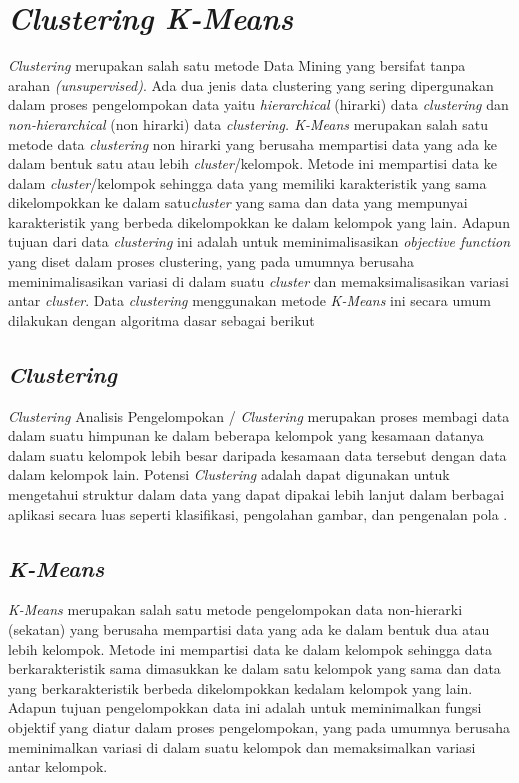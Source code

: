 \section{\textit{Clustering K-Means}}
\par \textit{Clustering} merupakan salah satu metode Data Mining yang bersifat tanpa arahan \textit{(unsupervised)}. Ada dua jenis data clustering yang sering dipergunakan dalam proses pengelompokan data yaitu \textit{hierarchical} (hirarki) data \textit{clustering} dan \textit{non-hierarchical} (non hirarki) data \textit{clustering. K-Means} merupakan salah satu metode data \textit{clustering} non hirarki yang berusaha mempartisi data yang ada ke dalam bentuk satu atau lebih \textit{cluster}/kelompok. Metode ini mempartisi data ke dalam \textit{cluster}/kelompok sehingga data yang memiliki karakteristik yang sama dikelompokkan ke dalam satu\textit{cluster} yang sama dan data yang mempunyai karakteristik yang berbeda dikelompokkan ke dalam kelompok yang lain. Adapun tujuan dari data \textit{clustering} ini adalah untuk meminimalisasikan \textit{objective function} yang diset dalam proses clustering, yang pada umumnya berusaha meminimalisasikan variasi di dalam suatu \textit{cluster} dan memaksimalisasikan variasi antar \textit{cluster}. Data \textit{clustering} menggunakan metode \textit{K-Means} ini secara umum dilakukan dengan algoritma dasar sebagai berikut \cite{sadewo2017penerapan}
\newpage

\subsection{\textit{Clustering}}
\textit{Clustering} Analisis Pengelompokan / \textit{Clustering} merupakan proses membagi data dalam suatu himpunan ke dalam beberapa kelompok yang kesamaan datanya dalam suatu kelompok lebih besar daripada kesamaan data tersebut dengan data dalam kelompok lain. Potensi \textit{Clustering} adalah dapat digunakan untuk mengetahui struktur dalam data yang dapat dipakai lebih lanjut dalam berbagai aplikasi secara luas seperti klasifikasi, pengolahan gambar, dan pengenalan pola \cite{sadewo2017penerapan}.

\subsection{\textit{K-Means}}
\textit{K-Means} merupakan salah satu metode pengelompokan data non-hierarki (sekatan) yang berusaha mempartisi data yang ada ke dalam bentuk dua atau lebih kelompok. Metode ini mempartisi data ke dalam kelompok sehingga data berkarakteristik sama dimasukkan ke dalam satu kelompok yang sama dan data yang berkarakteristik berbeda dikelompokkan kedalam kelompok yang lain. Adapun tujuan pengelompokkan data ini adalah untuk meminimalkan fungsi objektif yang diatur dalam proses pengelompokan, yang pada umumnya berusaha meminimalkan variasi di dalam suatu kelompok dan memaksimalkan variasi antar kelompok.

